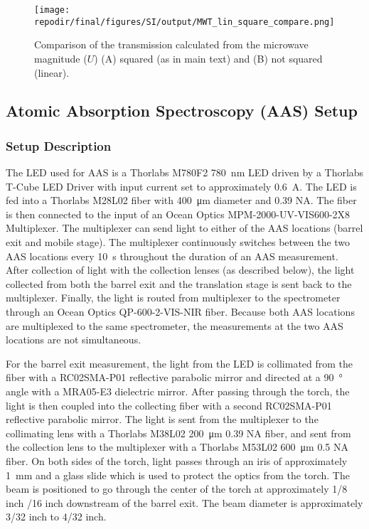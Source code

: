 
\begin{figure}[H]
\centering
\texttt{[image: \\repodir/final/figures/SI/output/MWT\_lin\_square\_compare.png]}
\caption{Comparison of the transmission calculated from the microwave magnitude ($U$) (A) squared (as in main text) and (B) not squared (linear).}
\label{fig:SI_MWT_lin_square_compare}
\end{figure}


\clearpage
\subsection{Atomic Absorption Spectroscopy (AAS) Setup}

\subsubsection{Setup Description}

The LED used for AAS is a Thorlabs M780F2 \SI{780} {\nano\meter} LED driven by a Thorlabs T-Cube LED Driver with input current set to approximately \SI{0.6} {\ampere}. The LED is fed into a Thorlabs M28L02 fiber with \SI{400} {\micro\meter} diameter and 0.39 NA. The fiber is then connected to the input of an Ocean Optics MPM-2000-UV-VIS600-2X8 Multiplexer. The multiplexer can send light to either of the AAS locations (barrel exit and mobile stage). The multiplexer continuously switches between the two AAS locations every \SI{10} {\second} throughout the duration of an AAS measurement. After collection of light with the collection lenses (as described below), the light collected from both the barrel exit and the translation stage is sent back to the multiplexer. Finally, the light is routed from multiplexer to the spectrometer through an Ocean Optics QP-600-2-VIS-NIR fiber. Because both AAS locations are multiplexed to the same spectrometer, the measurements at the two AAS locations are not simultaneous.

For the barrel exit measurement, the light from the LED is collimated from the fiber with a RC02SMA-P01 reflective parabolic mirror and directed at a \SI{90} {\degree} angle with a MRA05-E3 dielectric mirror. After passing through the torch, the light is then coupled into the collecting fiber with a second RC02SMA-P01 reflective parabolic mirror. The light is sent from the multiplexer to the collimating lens with a Thorlabs M38L02 \SI{200} {\micro\meter} 0.39 NA fiber, and sent from the collection lens to the multiplexer with a Thorlabs M53L02 \SI{600} {\micro\meter} 0.5 NA fiber. On both sides of the torch, light passes through an iris of approximately \SI{1} {\milli\meter} and a glass slide which is used to protect the optics from the torch. The beam is positioned to go through the center of the torch at approximately 1/8 inch /16 inch downstream of the barrel exit. The beam diameter is approximately 3/32 inch to 4/32 inch. 

